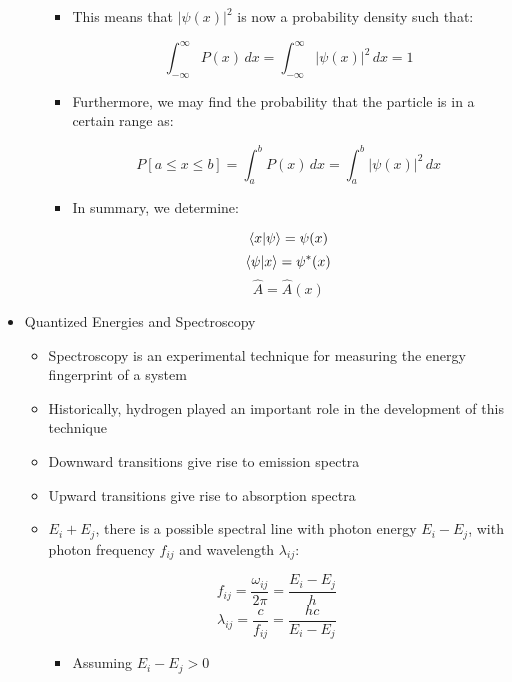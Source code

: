 \begin{itemize}
\begin{itemize}
\begin{itemize}
          \item This means that $|\psi(x)|^2$ is now a probability density such that:

            $$\int_{-\infty}^{\infty}P(x)\,dx=\int_{-\infty}^{\infty}|\psi(x)|^2\,dx=1$$

          \item Furthermore, we may find the probability that the particle is in a certain range as:

            $$P[a\leq x\leq b]=\int_{a}^{b}P(x)\,dx=\int_{a}^{b}|\psi(x)|^2\,dx$$

          \item In summary, we determine:

            $$\bra{x}\ket{\psi}=\psi(x)$$
            $$\bra{\psi}\ket{x}=\psi^*(x)$$
            $$\hat{A}=\hat{A}(x)$$

        \end{itemize}

    \end{itemize}

  \item Quantized Energies and Spectroscopy

    \begin{itemize}

      \item Spectroscopy is an experimental technique for measuring the energy fingerprint of a system

      \item Historically, hydrogen played an important role in the development of this technique

      \item Downward transitions give rise to emission spectra

      \item Upward transitions give rise to absorption spectra

      \item $E_i+E_j$, there is a possible spectral line with photon energy $E_i-E_j$, with photon frequency $f_{ij}$ and wavelength $\lambda_{ij}$:

        $$f_{ij}=\frac{\omega_{ij}}{2\pi}=\frac{E_i-E_j}{h}$$
        $$\lambda_{ij}=\frac{c}{f_{ij}}=\frac{hc}{E_i-E_j}$$

        \begin{itemize}

          \item Assuming $E_i-E_j>0$

        \end{itemize}


\end{itemize}
\end{itemize}
